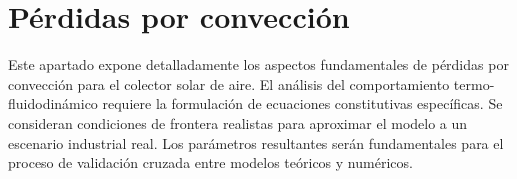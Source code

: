 \section{Pérdidas por convección}
\label{sec:cap06_conveccion}

Este apartado expone detalladamente los aspectos fundamentales de pérdidas por convección para el colector solar de aire.
El análisis del comportamiento termo-fluidodinámico requiere la formulación de ecuaciones constitutivas específicas.
Se consideran condiciones de frontera realistas para aproximar el modelo a un escenario industrial real.
Los parámetros resultantes serán fundamentales para el proceso de validación cruzada entre modelos teóricos y numéricos.

